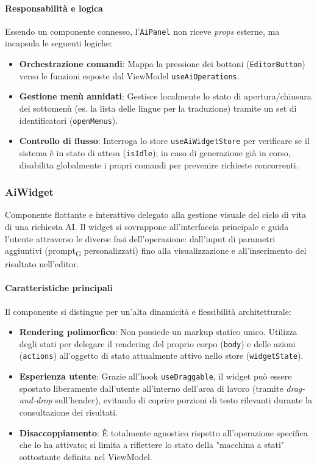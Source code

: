 \documentclass[11pt,a4paper]{article}
\newcommand{\gls}[1]{#1\textsubscript{G}}
\begin{document}
\paragraph{Responsabilità e logica}
Essendo un componente connesso, l'\texttt{AiPanel} non riceve \textit{props} esterne, ma incapsula le seguenti logiche:
\begin{itemize}
    \item \textbf{Orchestrazione comandi}: Mappa la pressione dei bottoni (\texttt{EditorButton}) verso le funzioni esposte dal ViewModel \texttt{useAiOperations}.
    \item \textbf{Gestione menù annidati}: Gestisce localmente lo stato di apertura/chiusura dei sottomenù (es. la lista delle lingue per la traduzione) tramite un set di identificatori (\texttt{openMenus}).
    \item \textbf{Controllo di flusso}: Interroga lo store \texttt{useAiWidgetStore} per verificare se il sistema è in stato di attesa (\texttt{isIdle}); in caso di generazione già in corso, disabilita globalmente i propri comandi per prevenire richieste concorrenti.
\end{itemize}


\subsubsection{AiWidget}
Componente flottante e interattivo delegato alla gestione visuale del ciclo di vita di una richiesta AI. Il widget si sovrappone all'interfaccia principale e guida l'utente attraverso le diverse fasi dell'operazione: dall'input di parametri aggiuntivi (\gls{prompt} personalizzati) fino alla visualizzazione e all'inserimento del risultato nell'editor.

\paragraph{Caratteristiche principali}
Il componente si distingue per un'alta dinamicità e flessibilità architetturale:
\begin{itemize}
    \item \textbf{Rendering polimorfico}: Non possiede un markup statico unico. Utilizza degli stati per delegare il rendering del proprio corpo (\texttt{body}) e delle azioni (\texttt{actions}) all'oggetto di stato attualmente attivo nello store (\texttt{widgetState}).
    \item \textbf{Esperienza utente}: Grazie all'hook \texttt{useDraggable}, il widget può essere spostato liberamente dall'utente all'interno dell'area di lavoro (tramite \textit{drag-and-drop} sull'header), evitando di coprire porzioni di testo rilevanti durante la consultazione dei risultati.
    \item \textbf{Disaccoppiamento}: È totalmente agnostico rispetto all'operazione specifica che lo ha attivato; si limita a riflettere lo stato della "macchina a stati" sottostante definita nel ViewModel.
\end{itemize}
\end{document}
